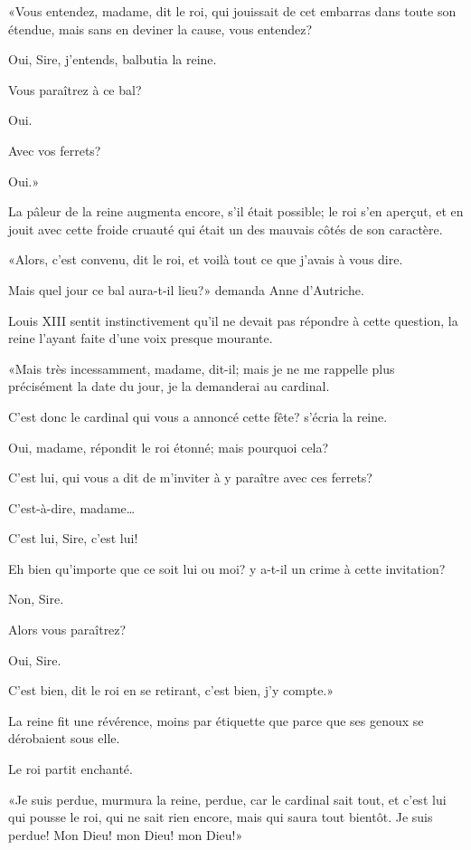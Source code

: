 «Vous entendez, madame, dit le roi, qui jouissait de cet embarras dans toute son étendue, mais sans en deviner la cause, vous entendez? 

\speak  Oui, Sire, j'entends, balbutia la reine. 

\speak  Vous paraîtrez à ce bal? 

\speak  Oui. 

\speak  Avec vos ferrets? 

\speak  Oui.» 

La pâleur de la reine augmenta encore, s'il était possible; le roi s'en aperçut, et en jouit avec cette froide cruauté qui était un des mauvais côtés de son caractère. 

«Alors, c'est convenu, dit le roi, et voilà tout ce que j'avais à vous dire. 

\speak  Mais quel jour ce bal aura-t-il lieu?» demanda Anne d'Autriche. 

Louis XIII sentit instinctivement qu'il ne devait pas répondre à cette question, la reine l'ayant faite d'une voix presque mourante. 

«Mais très incessamment, madame, dit-il; mais je ne me rappelle plus précisément la date du jour, je la demanderai au cardinal. 

\speak  C'est donc le cardinal qui vous a annoncé cette fête? s'écria la reine. 

\speak  Oui, madame, répondit le roi étonné; mais pourquoi cela? 

\speak  C'est lui, qui vous a dit de m'inviter à y paraître avec ces ferrets? 

\speak  C'est-à-dire, madame\dots 

\speak  C'est lui, Sire, c'est lui! 

\speak  Eh bien qu'importe que ce soit lui ou moi? y a-t-il un crime à cette invitation? 

\speak  Non, Sire. 

\speak  Alors vous paraîtrez? 

\speak  Oui, Sire. 

\speak  C'est bien, dit le roi en se retirant, c'est bien, j'y compte.» 

La reine fit une révérence, moins par étiquette que parce que ses genoux se dérobaient sous elle. 

Le roi partit enchanté. 

«Je suis perdue, murmura la reine, perdue, car le cardinal sait tout, et c'est lui qui pousse le roi, qui ne sait rien encore, mais qui saura tout bientôt. Je suis perdue! Mon Dieu! mon Dieu! mon Dieu!» 

